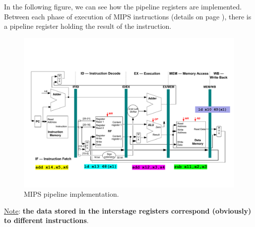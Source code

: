 \documentclass[a4paper]{article}
\newcommand{\highspace}{\vspace{1.2em}\noindent}
\begin{document}
    \highspace
    In the following figure, we can see how the pipeline registers are implemented. Between each phase of execution of MIPS instructions (details on page \pageref{Phases of execution of MIPS Instructions}), there is a pipeline register holding the result of the instruction.
    \begin{figure}[!htp]
        \centering
        \includegraphics[width=\textwidth]{img/pipeline-registers-1.pdf}
        \caption{MIPS pipeline implementation.\cite{pipelining-slides}}
    \end{figure}

    \noindent
    \underline{Note}: \textbf{the data stored in the interstage registers correspond (obviously) to different instructions}.

    \newpage
\end{document}
